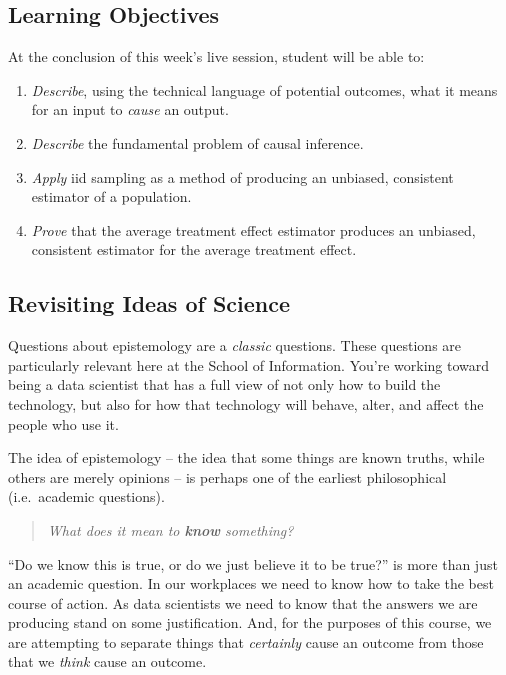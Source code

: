 \documentclass[
]{article}
\providecommand{\tightlist}{%
  \setlength{\itemsep}{0pt}\setlength{\parskip}{0pt}}
\theoremstyle{definition}
\theoremstyle{definition}
\theoremstyle{definition}
\theoremstyle{definition}
\theoremstyle{remark}
\begin{document}
\subsection{Learning Objectives}\label{learning-objectives-2}

At the conclusion of this week's live session, student will be able to:

\begin{enumerate}
\def\labelenumi{\arabic{enumi}.}
\tightlist
\item
  \emph{Describe}, using the technical language of potential outcomes, what it means for an input to \emph{cause} an output.
\item
  \emph{Describe} the fundamental problem of causal inference.
\item
  \emph{Apply} iid sampling as a method of producing an unbiased, consistent estimator of a population.
\item
  \emph{Prove} that the average treatment effect estimator produces an unbiased, consistent estimator for the average treatment effect.
\end{enumerate}

\subsection{Revisiting Ideas of Science}\label{revisiting-ideas-of-science}

Questions about epistemology are a \emph{classic} questions. These questions are particularly relevant here at the School of Information. You're working toward being a data scientist that has a full view of not only how to build the technology, but also for how that technology will behave, alter, and affect the people who use it.

The idea of epistemology -- the idea that some things are known truths, while others are merely opinions -- is perhaps one of the earliest philosophical (i.e.~academic questions).

\begin{quote}
\emph{What does it mean to \textbf{know} something?}
\end{quote}

``Do we know this is true, or do we just believe it to be true?'' is more than just an academic question. In our workplaces we need to know how to take the best course of action. As data scientists we need to know that the answers we are producing stand on some justification. And, for the purposes of this course, we are attempting to separate things that \emph{certainly} cause an outcome from those that we \emph{think} cause an outcome.
\end{document}
